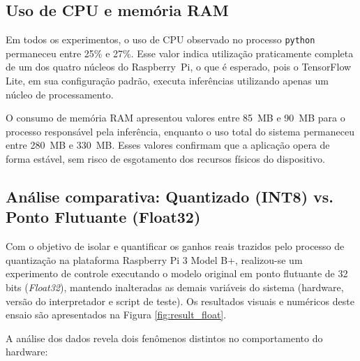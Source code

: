 \documentclass[repeatfields,xlists,xpacks,oneside]{ufrgscca}
\begin{document}
\subsection{Uso de CPU e memória RAM}

Em todos os experimentos, o uso de CPU observado no processo \texttt{python} permaneceu entre 25\% e 27\%. 
Esse valor indica utilização praticamente completa de um dos quatro núcleos do Raspberry~Pi, o que é esperado, pois o TensorFlow Lite, em sua configuração padrão, executa inferências utilizando apenas um núcleo de processamento.

O consumo de memória RAM apresentou valores entre 85~MB e 90~MB para o processo responsável pela inferência, enquanto o uso total do sistema permaneceu entre 280~MB e 330~MB. 
Esses valores confirmam que a aplicação opera de forma estável, sem risco de esgotamento dos recursos físicos do dispositivo.

\subsection{Análise comparativa: Quantizado (INT8) vs. Ponto Flutuante (Float32)}
\label{sec:comparativo-float}

Com o objetivo de isolar e quantificar os ganhos reais trazidos pelo processo de quantização na plataforma Raspberry Pi 3 Model B+, realizou-se um experimento de controle executando o modelo original em ponto flutuante de 32 bits (\textit{Float32}), mantendo inalteradas as demais variáveis do sistema (hardware, versão do interpretador e script de teste). Os resultados visuais e numéricos deste ensaio são apresentados na Figura \ref{fig:result_float}.

A análise dos dados revela dois fenômenos distintos no comportamento do hardware:
\end{document}
